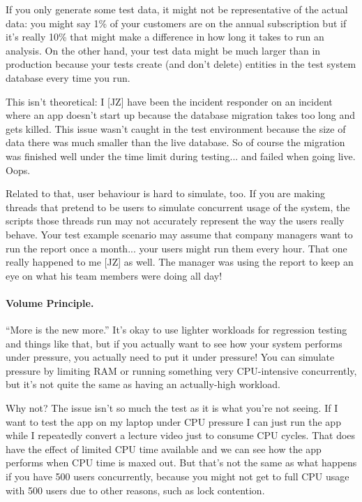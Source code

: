 If you only generate some test data, it might not be representative of the actual data: you might say 1\% of your customers are on the annual subscription but if it's really 10\% that might make a difference in how long it takes to run an analysis. On the other hand, your test data might be much larger than in production because your tests create (and don't delete) entities in the test system database every time you run.

This isn't theoretical: I [JZ] have been the incident responder on an incident where an app doesn't start up because the database migration takes too long and gets killed. This issue wasn't caught in the test environment because the size of data there was much smaller than the live database. So of course the migration was finished well under the time limit during testing... and failed when going live. Oops.

Related to that, user behaviour is hard to simulate, too. If you are making threads that pretend to be users to simulate concurrent usage of the system, the scripts those threads run may not accurately represent the way the users really behave. Your test example scenario may assume that company managers want to run the report once a month... your users might run them every hour. That one really happened to me [JZ] as well. The manager was using the report to keep an eye on what his team members were doing all day!

\paragraph{Volume Principle.}
``More is the new more.'' It's okay to use lighter workloads for regression testing and things like that, but if you actually want to see how your system performs under pressure, you actually need to put it under pressure! You can simulate pressure by limiting RAM or running something very CPU-intensive concurrently, but it's not quite the same as having an actually-high workload. 

Why not? The issue isn't so much the test as it is what you're not seeing. If I want to test the app on my laptop under CPU pressure I can just run the app while I repeatedly convert a lecture video just to consume CPU cycles. That does have the effect of limited CPU time available and we can see how the app performs when CPU time is maxed out. But that's not the same as what happens if you have 500 users concurrently, because you might not get to full CPU usage with 500 users due to other reasons, such as lock contention. 

